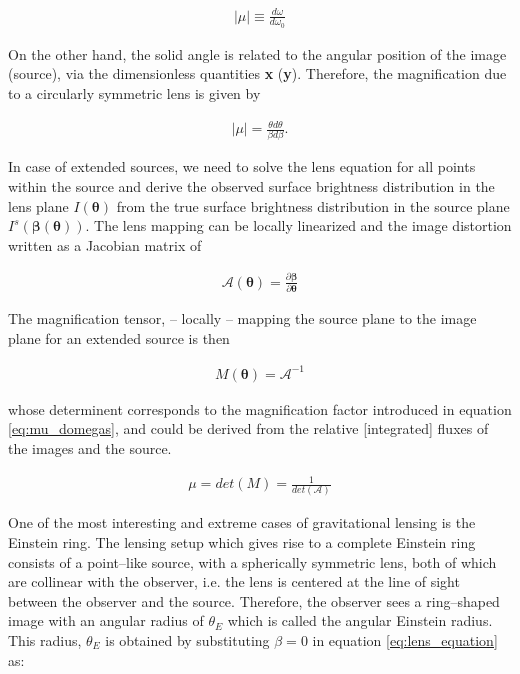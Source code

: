 \documentclass[a4wide,12pt]{book}
\begin{document}
{\begin{eqnarray}
\label{eq:mu_domegas}
|\mu| \equiv \frac{d\omega}{d\omega_0}
\end{eqnarray}

On the other hand, the solid angle is related to the angular position of the image (source), via the dimensionless quantities \textbf{x} (\textbf{y}). Therefore, the magnification due to a circularly symmetric lens is given by 

\begin{eqnarray}
\label{eq:mu_beta_theta}
|\mu| = \frac{\theta d\theta}{\beta d\beta}.
\end{eqnarray}

In case of extended sources, we need to solve the lens equation for all points within the source and derive the observed surface brightness distribution in the lens plane $I({\boldsymbol \theta})$ from the true surface brightness distribution in the source plane $I^s({\boldsymbol \beta(\boldsymbol \theta)})$. The lens mapping can be locally linearized and the image distortion written as a Jacobian matrix of 

\begin{eqnarray}
\label{eq:Jacobian}
\mathcal{A}(\boldsymbol \theta) = \frac{\partial \boldsymbol \beta}{\partial \boldsymbol \theta}
\end{eqnarray}

The magnification tensor, -- locally -- mapping the source plane to the image plane for an extended source is then

\begin{eqnarray}
\label{eq:magnification_tensor}
M(\boldsymbol \theta) = \mathcal{A}^{-1}
\end{eqnarray}

whose determinent corresponds to the magnification factor introduced in equation \ref{eq:mu_domegas}, and could be derived from the relative [integrated] fluxes of the images and the source.

\begin{eqnarray}
\label{eq:mu_extended}
\mu = det(M) = \frac{1}{det(\mathcal{A})}
\end{eqnarray}

One of the most interesting and extreme cases of gravitational lensing is the Einstein ring. The lensing setup which gives rise to a complete Einstein ring consists of a point--like source, with a spherically symmetric lens, both of which are collinear with the observer, i.e. the lens is centered at the line of sight between the observer and the source. Therefore, the observer sees a ring--shaped image with an angular radius of $\theta_E$ which is called the angular Einstein radius. This radius, $\theta_E$ is obtained by substituting $\beta=0$ in equation \ref{eq:lens_equation} as:

}
\end{document}

